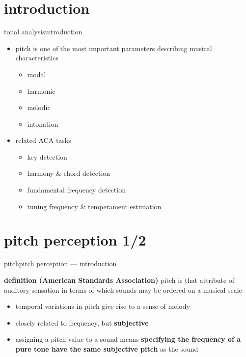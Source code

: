     \section[intro]{introduction}
        \begin{frame}{tonal analysis}{introduction}
            \begin{itemize}
                \item pitch is one of the most important parameters describing musical characteristics
                    \begin{itemize}
                        \item   modal
                        \item   harmonic
                        \item   melodic
                        \item   intonation
                    \end{itemize}
                \item<2-> related ACA tasks
                    \begin{itemize}
                        \item   key detection
                        \item   harmony \& chord detection
                        \item   fundamental frequency detection
                        \item   tuning frequency \& temperament estimation
                    \end{itemize}
            \end{itemize}
        \end{frame}

    \section[perception]{pitch perception 1/2}
         \begin{frame}{pitch}{pitch perception --- introduction}
            \begin{block}{\textbf{definition (American Standards Association)}}
                pitch is that attribute of auditory sensation in terms of which sounds may be ordered on a musical scale
            \end{block}
            \bigskip    
            \begin{itemize}
                \item<2->   temporal variations in pitch give rise to a sense of melody
                \item<2->   closely related to frequency, but \textbf{subjective}

                \bigskip
                \item<3->[$\Rightarrow$]   assigning a pitch value to a sound means \textbf{specifying the frequency of a pure tone have the same subjective pitch} as the sound
            \end{itemize}
        \end{frame}
        
